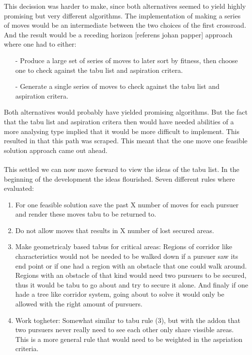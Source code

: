 \begin{enumerate}
This decission was harder to make, since both alternatives seemed to yield highly promising but very different algorithms. The implementation of making a series of moves would be an intermediate between the two choices of the first crossroad. And the result would be a receding horizon [referens johan papper] approach where one had to either:
\begin{itemize}
\item[-]{}Produce a large set of series of moves to later sort by fitness, then choose one to check against the tabu list and aspiration critera.
\item[-]{}Generate a single series of moves to check against the tabu list and aspiration critera.
\end{itemize}

Both alternatives would probably have yielded promising algorithms. But the fact that the tabu list and aspiration critera then would have needed abilities of a more analysing type implied that it would be more difficult to implement. This resulted in that this path was scraped. This meant that the one move one feasible solution approach came out ahead.\\
\\
This settled we can now move forward to view the ideas of the tabu list. In the beginning of the development the ideas flourished. Seven different rules where evaluated:
\begin{enumerate}
\item{}For one feasible solution save the past X number of moves for each pursuer and render these moves tabu to be returned to.
\item{}Do not allow moves that results in X number of lost secured areas.
\item{}Make geometricaly based tabus for critical areas:
\subitem{} Regions of corridor like characteristics would not be needed to be walked down if a pursuer saw its end point or if one had a region with an obstacle that one could walk around. Regions with an obstacle of that kind would need two pursuers to be secured, thus it would be tabu to go about and try to secure it alone. And finaly if one hade a tree like corridor system, going about to solve it would only be allowed with the right amount of pursuers.
\item{} Work togheter:
\subitem{} Somewhat similar to tabu rule (3), but with the addon that two pursuers never really need to see each other only share vissible areas. This is  a more general rule that would need to be weighted in the aspriation criteria.

\end{enumerate}
\end{enumerate}
